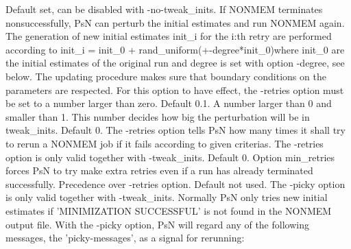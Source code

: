 \begin{optionlist}
Default set, can be disabled with -no-tweak\_inits. 
If NONMEM terminates nonsuccessfully, PsN can perturb the initial estimates and run NONMEM again. The generation of new initial estimates init\_i for the i:th retry are performed according to init\_i = init\_0 + rand\_uniform(+-degree*init\_0)where init\_0 are the initial estimates of the original run
and degree is set with option -degree, see below. 
The updating procedure makes sure that boundary conditions on the parameters are respected. 
For this option to have effect, the -retries option must be set to a number larger than zero. 
\nextopt
{}
Default 0.1. A number larger than 0 and smaller than 1. This number decides how big the perturbation will
be in tweak\_inits.
\nextopt
{}
Default 0. The -retries option tells PsN how many times it shall try to rerun a NONMEM job if it fails according to given criterias. 
The -retries option is only valid together with -tweak\_inits. 
\nextopt
{}
Default 0. Option min\_retries forces PsN to try make extra retries even if a run has already terminated successfully. Precedence over -retries option.  
\nextopt
{}
Default not used. The -picky option is only valid together with -tweak\_inits. Normally PsN only tries new initial estimates if 'MINIMIZATION SUCCESSFUL' is not found in the NONMEM output file. With the -picky option, PsN will regard any of the following messages, the 'picky-messages',  as a signal for rerunning:



\end{optionlist}
